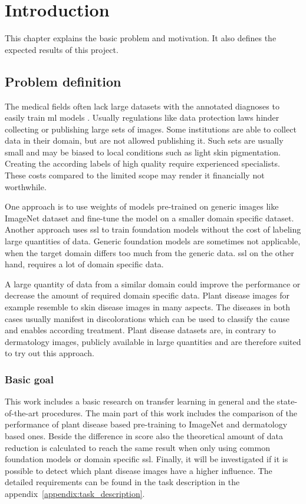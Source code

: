\chapter{Introduction}
This chapter explains the basic problem and motivation. It also defines the expected results of this project.

\section{Problem definition}

The medical fields often lack large datasets with the annotated diagnoses to easily train \gls{ml} models \autocite{castro2019}.
Usually regulations like data protection laws hinder collecting or publishing large sets of images. Some institutions are able to collect data in their domain, but are not allowed publishing it. Such sets are usually small and may be biased to local conditions such as light skin pigmentation.
Creating the according labels of high quality require experienced specialists. These costs compared to the limited scope may render it financially not worthwhile.

One approach is to use weights of models pre-trained on generic images like ImageNet dataset and fine-tune the model on a smaller domain specific dataset. Another approach uses \gls{ssl} to train foundation models without the cost of labeling large quantities of data. 
Generic foundation models are sometimes not applicable, when the target domain differs too much from the generic data.%
\gls{ssl} on the other hand, requires a lot of domain specific data.

A large quantity of data from a similar domain could improve the performance or decrease the amount of required domain specific data. 
Plant disease images for example resemble to skin disease images in many aspects. The diseases in both cases usually manifest in discolorations which can be used to classify the cause and enables according treatment.
Plant disease datasets are, in contrary to dermatology images, publicly available in large quantities and are therefore suited to try out this approach.


\subsection{Basic goal}
This work includes a basic research on transfer learning in general and the state-of-the-art procedures. 
The main part of this work includes the comparison of the performance of plant disease based pre-training to ImageNet and dermatology based ones. Beside the difference in score also the theoretical amount of data reduction is calculated to reach the same result when only using common foundation models or domain specific \gls{ssl}. 
Finally, it will be investigated if it is possible to detect which plant disease images have a higher influence.
The detailed requirements can be found in the task description in the appendix~\ref{appendix:task_description}.

